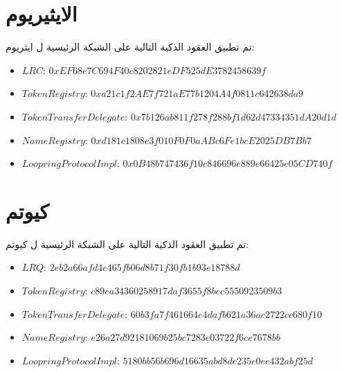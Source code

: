 \documentclass[12pt, a4paper, leqno]{report}
\theoremstyle{plain}
\theoremstyle{definition}
\begin{document}
\section{الايثيريوم}
تم تطبيق العقود الذكية التالية على الشبكة الرئيسية ل ايثريوم:
\begin{itemize}
\item $LRC$: $0xEF68e7C694F40c8202821eDF525dE3782458639f$
\item $TokenRegistry$: $0xa21c1f2AE7f721aE77b1204A4f0811c642638da9$
\item $TokenTransferDelegate$: $0x7b126ab811f278f288bf1d62d47334351dA20d1d$
\item $NameRegistry$: $0xd181c1808e3f010F0F0aABc6Fe1bcE2025DB7Bb7$
\item $LoopringProtocolImpl$: $0x0B48b747436f10c846696e889e66425e05CD740f$
\end{itemize}
\section{كيوتم}
تم تطبيق العقود الذكية التالية على الشبكة الرئيسية ل كيوتم:
\begin{itemize}
\item $LRQ$:  $2eb2a66afd4e465fb06d8b71f30fb1b93e18788d$
\item $TokenRegistry$: $c89ea34360258917daf3655f8bec5550923509b3$
\item $TokenTransferDelegate$: $60b3fa7f461664e4dafb621a36ac2722cc680f10$
\item $NameRegistry$: $e26a27d92181069b25bc7283e03722f6ce7678bb$
\item $LoopringProtocolImpl$: $5180bb56b696d16635abd8dc235e0ee432abf25d$
\end{itemize}
\end{document}
